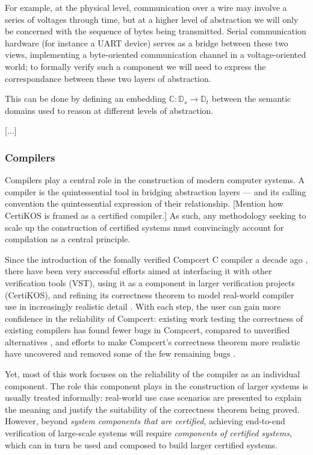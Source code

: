 \documentclass[acmsmall,timestamp,review]{acmart}
\begin{document}
For example,
at the physical level,
communication over a wire may involve a series of voltages through time,
but at a higher level of abstraction
we will only be concerned with the sequence of bytes
being transmitted.
Serial communication hardware (for instance a UART device)
serves as a bridge between these two views,
implementing a byte-oriented communication channel
in a voltage-oriented world;
to formally verify such a component we will need to
express the correspondance between these two
layers of abstraction.

This can be done by defining an embedding
$\mathbb{C} : \mathbb{D}_s \rightarrow \mathbb{D}_t$
between the semantic domains
used to reason at different levels of abstraction.

[...]


\subsubsection{Compilers} %

Compilers play a central role
in the construction of modern computer systems.
A compiler is the quintessential tool
in bridging abstraction layers ---
and its calling convention
the quintessential expression of their relationship.
[Mention how CertiKOS is framed as a certified compiler.]
As such,
any methodology seeking to scale up
the construction of certified systems
must convincingly account for compilation
as a central principle.

Since the introduction of the fomally verified
Compcert C compiler a decade ago \cite{compcert},
there have been very successful efforts aimed at
interfacing it with other verification tools (VST),
using it as a component in larger verification projects (CertiKOS),
and refining its correctness theorem
to model real-world compiler use
in increasingly realistic detail
\cite{qompcert,sepcompcert,compcompcert,compcerttso,compcertshm}.
With each step,
the user can gain more confidence in the reliability of Compcert:
existing work testing the correctness of existing compilers
has found fewer bugs in Compcert,
compared to unverified alternatives \cite{csmith},
and efforts to make Compcert's correctness theorem more realistic
have uncovered and removed some of the few remaining bugs \cite{sepcompcert}.

Yet, most of this work
focuses on the reliability of the compiler
as an individual component.
The role this component plays in the construction of larger systems
is usually treated informally:
real-world use case scenarios are presented
to explain the meaning and justify the suitability
of the correctness theorem being proved.
However,
beyond \emph{system components that are certified},
achieving end-to-end verification of large-scale systems
will require \emph{components of certified systems},
which can in turn be used and composed
to build larger certified systems.
\end{document}
